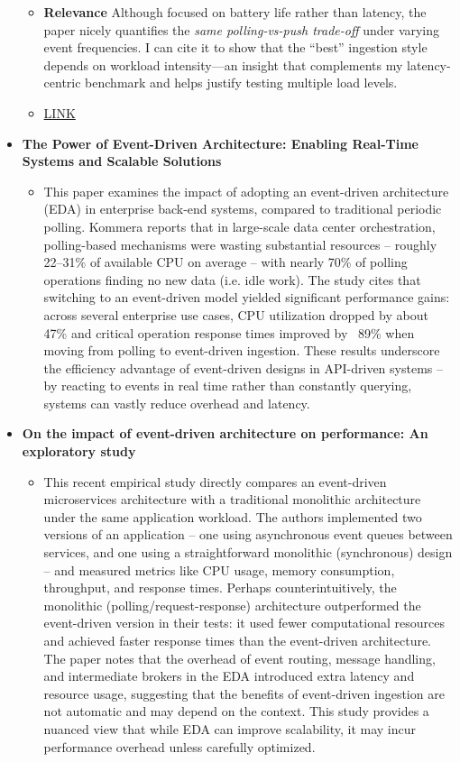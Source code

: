 \documentclass[11pt]{article}
\begin{document}
\begin{itemize}
\begin{itemize}
      \item[] \textbf{Relevance} Although focused on battery life rather than latency, the paper nicely quantifies the \textit{same polling-vs-push trade-off} under varying event frequencies.  
      I can cite it to show that the “best” ingestion style depends on workload intensity—an insight that complements my latency-centric benchmark and helps justify testing multiple load levels.
      \item[] \href{https://www.researchgate.net/publication/335426973\_Energy-Efficient\_Network\_Protocols\_for\_Domestic\_IoT\_Application\_Design}{LINK}
  \end{itemize}
  \newpage
  \item[] \textbf{The Power of Event-Driven Architecture: Enabling Real-Time Systems and Scalable Solutions}
  \begin{itemize}
      \item[] This paper examines the impact of adopting an event-driven architecture (EDA) in enterprise back-end systems, compared to traditional periodic polling. Kommera reports that in large-scale data center orchestration, polling-based mechanisms were wasting substantial resources – roughly 22–31\% of available CPU on average – with nearly 70\% of polling operations finding no new data (i.e. idle work). The study cites that switching to an event-driven model yielded significant performance gains: across several enterprise use cases, CPU utilization dropped by about 47\% and critical operation response times improved by ~89\% when moving from polling to event-driven ingestion. These results underscore the efficiency advantage of event-driven designs in API-driven systems – by reacting to events in real time rather than constantly querying, systems can vastly reduce overhead and latency.
  \end{itemize}
  \item[] \textbf{On the impact of event-driven architecture on performance: An exploratory
study}
  \begin{itemize}
      \item[] This recent empirical study directly compares an event-driven microservices architecture with a traditional monolithic architecture under the same application workload. The authors implemented two versions of an application – one using asynchronous event queues between services, and one using a straightforward monolithic (synchronous) design – and measured metrics like CPU usage, memory consumption, throughput, and response times. Perhaps counterintuitively, the monolithic (polling/request-response) architecture outperformed the event-driven version in their tests: it used fewer computational resources and achieved faster response times than the event-driven architecture. The paper notes that the overhead of event routing, message handling, and intermediate brokers in the EDA introduced extra latency and resource usage, suggesting that the benefits of event-driven ingestion are not automatic and may depend on the context. This study provides a nuanced view that while EDA can improve scalability, it may incur performance overhead unless carefully optimized.

\end{itemize}
\end{itemize}
\end{document}
